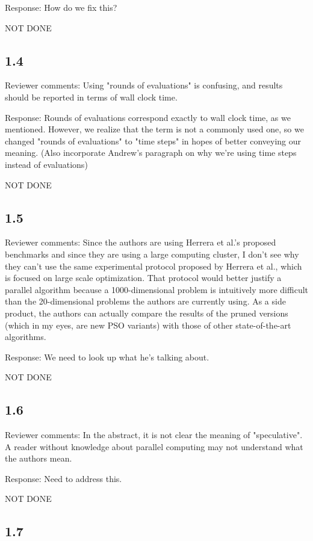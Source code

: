 \documentclass[onecolumn, 12pt]{article}
\begin{document}
Response: How do we fix this?

NOT DONE

\subsection*{1.4}

Reviewer comments: Using "rounds of evaluations" is confusing, and results
should be reported in terms of wall clock time.

Response: Rounds of evaluations correspond exactly to wall clock time, as we
mentioned.  However, we realize that the term is not a commonly used one, so we
changed "rounds of evaluations" to "time steps" in hopes of better conveying
our meaning. (Also incorporate Andrew's paragraph on why we're using time steps
instead of evaluations)

NOT DONE

\subsection*{1.5}

Reviewer comments: Since the authors are using Herrera et al.'s proposed
benchmarks and since they are using a large computing cluster, I don't see why
they can't use the same experimental protocol proposed by Herrera et al., which
is focused on large scale optimization. That protocol would better justify a
parallel algorithm because a 1000-dimensional problem is intuitively more
difficult than the 20-dimensional problems the authors are currently using. As
a side product, the authors can actually compare the results of the pruned
versions (which in my eyes, are new PSO variants) with those of other
state-of-the-art algorithms.

Response: We need to look up what he's talking about.

NOT DONE

\subsection*{1.6}

Reviewer comments: In the abstract, it is not clear the meaning of
"speculative". A reader without knowledge about parallel computing may not
understand what the authors mean.

Response: Need to address this.

NOT DONE

\subsection*{1.7}
\end{document}
